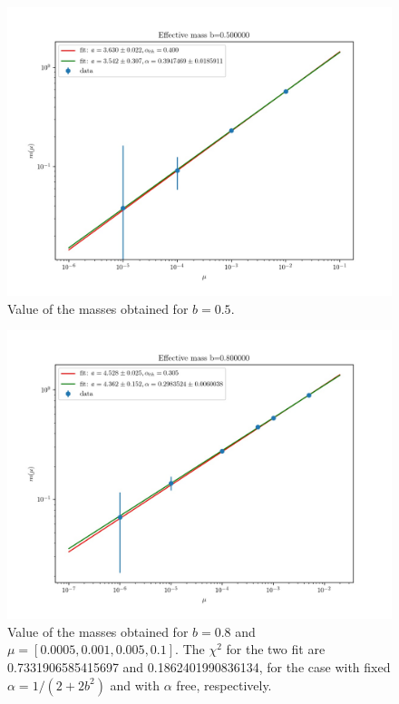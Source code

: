 \documentclass[12pt,a4paper]{report}
\begin{document}
\begin{figure}
\label{fig:mass_scaling_b0.5}
\centering
\includegraphics[width=1.0\textwidth]{b0_5}
\caption{Value of the masses obtained for $b=0.5$.}
\end{figure}



\begin{figure}
\label{fig:mass_scaling_b0.8}
\centering
\includegraphics[width=1.0\textwidth]{b0_8}
\caption{Value of the masses obtained for $b=0.8$ and 
$\mu = [0.0005,0.001,0.005,0.1]$. The $\chi^2$ for the two fit are 0.7331906585415697
 and 0.1862401990836134, for the case with fixed $\alpha = 1/(2+2b^2)$ and with $\alpha$ free, respectively.}
\end{figure}
\end{document}

